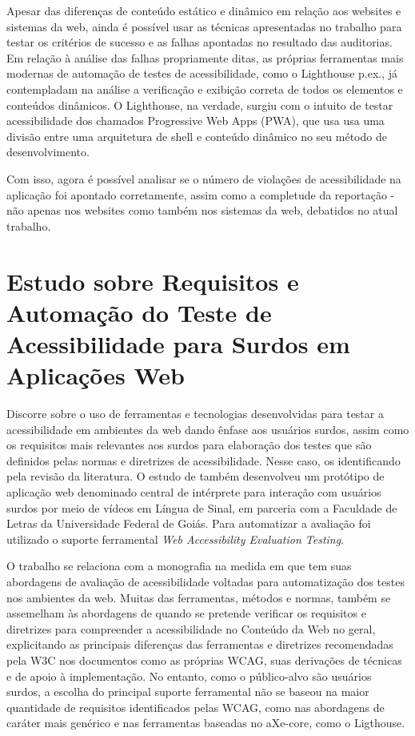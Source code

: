 \documentclass[
	12pt,				%
	openright,			%
	oneside,			%
	a4paper,			%
	chapter=TITLE,		%
	section=TITLE,		%
	subsection=TITLE,	%
	subsubsection=TITLE,%
	english,			%
	brazil				%
	]{abntex2}
\theoremstyle{definition}
\begin{document}
Apesar das diferenças de conteúdo estático e dinâmico em relação aos websites e sistemas da web, ainda é possível usar as técnicas apresentadas no trabalho para testar os critérios de sucesso e as
falhas apontadas no resultado das auditorias. Em relação à análise das falhas propriamente ditas, as próprias ferramentas mais modernas de automação de testes de acessibilidade, como o Lighthouse p.ex., já contempladam  na análise a verificação e exibição correta de todos os elementos e conteúdos dinâmicos. O Lighthouse, na verdade, surgiu com o intuito de testar acessibilidade dos chamados Progressive Web Apps (PWA), que usa  usa uma divisão entre uma arquitetura de shell e conteúdo dinâmico no seu método de desenvolvimento.

Com isso, agora é possível analisar se o número de violações de acessibilidade na aplicação foi apontado corretamente, assim como a completude da reportação - não apenas nos websites como também nos sistemas da web, debatidos no atual trabalho.

\section{Estudo sobre Requisitos e Automação do Teste de Acessibilidade para Surdos em Aplicações Web}

Discorre sobre o uso de ferramentas e tecnologias desenvolvidas para testar a acessibilidade em ambientes da web dando ênfase aos usuários surdos, assim como os requisitos mais relevantes aos surdos para elaboração dos testes que são definidos pelas normas e diretrizes de acessibilidade. Nesse caso, os identificando pela revisão da literatura. O estudo de \cite{sousa2020estudo} também desenvolveu um protótipo de aplicação web denominado central de intérprete para interação com usuários surdos por meio de vídeos em Língua de Sinal, em parceria com a Faculdade de Letras da Universidade Federal de Goiás. Para automatizar a avaliação foi utilizado o suporte ferramental \textit{Web Accessibility Evaluation Testing}.

O trabalho se relaciona com a monografia na medida em que tem suas abordagens de avaliação de acessibilidade voltadas para automatização dos testes nos ambientes da web. Muitas das ferramentas, métodos e normas, também se assemelham às abordagens de quando se pretende verificar os requisitos e diretrizes para compreender a acessibilidade no Conteúdo da Web no geral, explicitando as principais diferenças das ferramentas e diretrizes recomendadas pela W3C nos documentos como as próprias WCAG, suas derivações de técnicas e de apoio à implementação. No entanto, como o público-alvo são usuários surdos, a escolha do principal suporte ferramental não se baseou na maior quantidade de requisitos identificados pelas WCAG, como nas abordagens de caráter mais genérico e nas ferramentas baseadas no aXe-core, como o Ligthouse.
\end{document}
